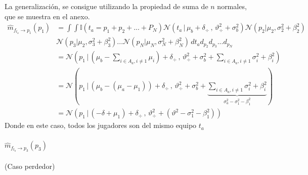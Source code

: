 \documentclass[11pt,twoside,spanish]{report} %
\begin{document}
La generalizaci\'on, se consigue utilizando la propiedad de suma de $n$ normales, que se muestra en el anexo.
\begin{equation}
	\begin{split}
		\widehat{m}_{f_{t_a} \rightarrow p_1}(p_1) &=\int \int \mathbb{I}(t_a = p_1 + p_2 + ...+ P_N) \mathcal{N}(t_a \, | \, \mu_b + \delta_{\div} \, , \, \vartheta_{\div}^2 + \sigma_b^2) \mathcal{N}(p_2 | \mu_2 , \sigma_2^2 + \beta_2^2)\\ &\mathcal{N}(p_3 | \mu_2 , \sigma_3^2 + \beta_3^2)... \mathcal{N}(p_N | \mu_N , \sigma_N^2 + \beta_N^2)  \, d{t_a} d_{p_2}d_{p_3}...d_{p_N} \\
		&= \mathcal{N}( p_1 \,|\, (\mu_b  - \sum_{i \in A_a, i\neq1} \mu_i) + \delta_{\div}  \,,\,\vartheta_{\div}^2 + \sigma_b^2 + \sum_{i \in A_a, i\neq1} \sigma_i^2 + \beta_i^2 ) \\
		&= \mathcal{N}( p_1 \,|\, (\mu_b  -(\mu_a-\mu_1)) + \delta_{\div}  \,,\,\vartheta_{\div}^2 + \sigma_b^2 + \underbrace{\sum_{i \in A_a, i\neq1} \sigma_i^2 + \beta_i^2}_{\sigma_a^2-\sigma_1^2 - \beta_1^2} ) \\
		& = \mathcal{N}( p_1 \,|\, (-\delta + \mu_1) + \delta_{\div}  \,,\,\vartheta_{\div}^2 + (\vartheta^2 - \sigma_1^2 - \beta_1^2))
	\end{split}
\end{equation}
Donde en este caso, todos los jugadores son del mismo equipo $t_a$
\paragraph{$\widehat{m}_{f_{t_b} \rightarrow p_3}(p_3)$} (Caso perdedor)
\end{document}
